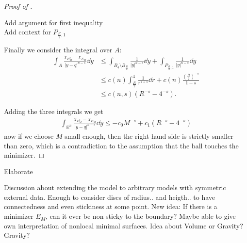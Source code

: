 \begin{proof}[Proof of ]
	\begin{TODO}
		Add argument for first inequality\\
		Add context for \( P_{\frac{R}{2}, 1} \)
	\end{TODO}
	Finally we consider the integral over \( A \):
	\begin{align*}
		\int_A \frac{\chi_{E_M^c} - \chi_{E_M}}{\lvert y - q \rvert^{n - s}} \dd{y}
		 & \leq \int_{B_4 \setminus B_{\frac{R}{2}}} \frac{1}{\lvert y \rvert^{n - s}} \dd{y} + \int_{P_{\frac{R}{2}, 1}} \frac{1}{\lvert y \rvert^{n - s}} \dd{y} \\
		 & \leq c(n) \int_{\frac{R}{2}}^4 \frac{1}{r^{1 + s}} \dd{r} + c(n) \frac{(\frac{R}{2})^{- s}}{1 - s} \\
		 & \leq c(n, s) (R^{- s} - 4^{- s}).
	\end{align*}

	Adding the three integrals we get
	\begin{align*}
		\int_{\mathbb{R}^n} \frac{\chi_{E_M^c} - \chi_{E_M}}{\lvert y - q \rvert^{n - s}} \dd{y} \leq - c_0 M^{- s} + c_1 (R^{- s} - 4^{- s})
	\end{align*}
	now if we choose \( M \) small enough, then the right hand side is strictly smaller than
	zero, which is a contradiction to the assumption that the ball touches the minimizer.

\end{proof}


\begin{TODO}
	Elaborate
\end{TODO}
Discussion about extending the model to arbitrary models with symmetric external data.
Enough to consider discs of radius.. and heigth.. to have connectedness and even
stickiness at some point.\newline
New idea: If there is a minimizer \( E_M \), can it ever be non sticky to the
boundary?\newline
Maybe able to give own interpretation of nonlocal minimal surfaces. Idea about Volume or
Gravity?
Gravity?
